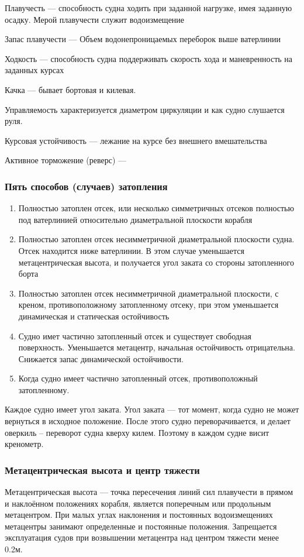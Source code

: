 \documentclass{article}        %
\begin{document}
Плавучесть --- способность судна ходить при заданной нагрузке, имея заданную осадку.
Мерой плавучести служит водоизмещение

Запас плавучести --- Объем водонепроницаемых переборок выше ватерлинии

Ходкость --- способность судна поддерживать скорость хода и маневренность на заданных курсах

Качка --- бывает бортовая и килевая.

Управляемость характеризуется диаметром циркуляции и как судно слушается руля.

Курсовая устойчивость --- лежание на курсе без внешнего вмешательства

Активное торможение (реверс) --- 

\subsubsection{Пять способов (случаев) затопления}
\begin{enumerate}
	\item Полностью затоплен отсек, или несколько симметричных отсеков полностью под ватерлинией относительно диаметральной плоскости корабля
	\item Полностью затоплен отсек несимметричной диаметральной плоскости судна. Отсек находится ниже ватерлинии. В этом случае уменьшается метацентрическая высота, и получается угол заката со стороны затопленного борта
	\item Полностью затоплен отсек несимметричной диаметральной плоскости, с креном, противоположному затопленному отсеку, при этом уменьшается динамическая и статическая остойчивость
	\item Судно имет частично затопленный отсек и существует свободная поверхность. Уменьшается метацентр, начальная остойчивость отрицательна. Снижается запас динамической остойчивости.
	\item Когда судно имеет частично затопленный отсек, противоположный затопленному.
\end{enumerate}

Каждое судно имеет угол заката. 
Угол заката --- тот момент, когда судно не может вернуться в исходное положение. После этого судно переворачивается, и делает оверкиль -- переворот судна кверху килем.
Поэтому в каждом судне висит кренометр.

\subsubsection{Метацентрическая высота и центр тяжести}
Метацентрическая высота --- точка пересечения линий сил плавучести в прямом и наклоённом положениях корабля, 
	является поперечным или продольным метацентром. При малых углах наклонения и постоянных водоизмещениях метацентры занимают определенные и постоянные положения. Запрещается эксплуатация судов при возвышении метацентра над центром тяжести менее 0.2м. 
\end{document}
